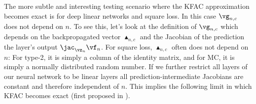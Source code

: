 The more subtle and interesting testing scenario where the KFAC approximation becomes exact is for deep linear networks and square loss.
In this case $\vg_{n,c}$ does not depend on $n$.
To see this, let's look at the definition of $\vg_{n,c}$ which depends on the backpropagated vector $\blacktriangle_{n,c}$ and the Jacobian of the prediction \wrt the layer's output $\jac_{\vz_n} \vf_n$.
For square loss, $\blacktriangle_{n,c}$ often does not depend on $n$: For type-2, it is simply a column of the identity matrix, and for MC, it is simply a normally distributed random number.
If we further restrict all layers of our neural network to be linear layers all prediction-intermediate Jacobians are constant and therefore independent of $n$.
This implies the following limit in which KFAC becomes exact (first proposed in \cite{bernacchia2018exact}).

